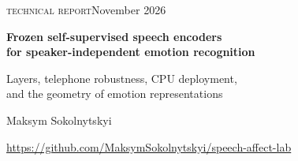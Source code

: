 \documentclass[11pt,a4paper]{article}
\begin{document}
\thispagestyle{empty}
\begingroup
{}
%
\endgroup
\noindent\begin{minipage}{0.76\linewidth}
{\small\color{muted}\textsc{technical report}\hfill November 2026}\par
\vspace{1.5cm}
\raggedright
{\LARGE\bfseries Frozen self-supervised speech encoders\\[3pt]
for speaker-independent emotion recognition\par}
\vspace{8pt}
{\large\color{muted}Layers, telephone robustness, CPU deployment,\\
and the geometry of emotion representations\par}
\vspace{1.0cm}
{\large Maksym Sokolnytskyi}\par
{\small\url{https://github.com/MaksymSokolnytskyi/speech-affect-lab}}\par
\end{minipage}
\end{document}
